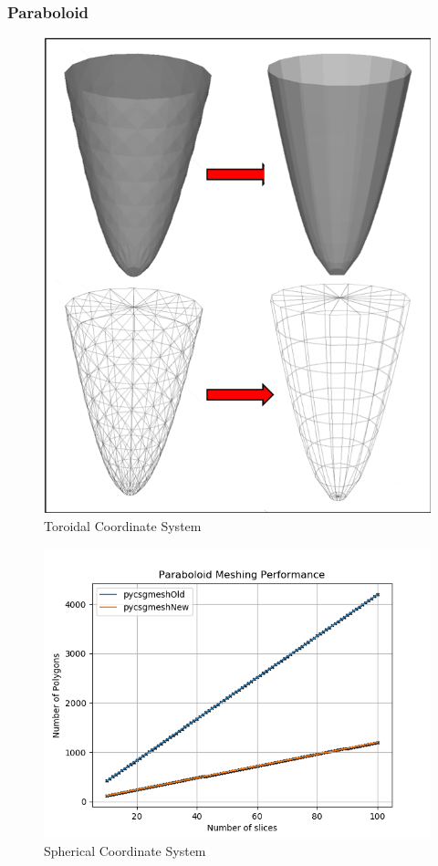 \documentclass[12pt,a4paper]{article}
\begin{document}
\newpage
\subsubsection{Paraboloid}

\begin{figure}[h!]
\centering
\includegraphics[scale=0.5]{Images//Meshes//paraboloid.png}
\caption[width=\columnwidth]{Toroidal Coordinate System}
\label{conts}
\end{figure}

\begin{figure}[h!]
\centering
\includegraphics[scale=0.5]{Images//Quad_fits//Paraboloid_quad.png}
\caption[width=\columnwidth]{Spherical Coordinate System}
\label{conts}
\end{figure}
\end{document}

